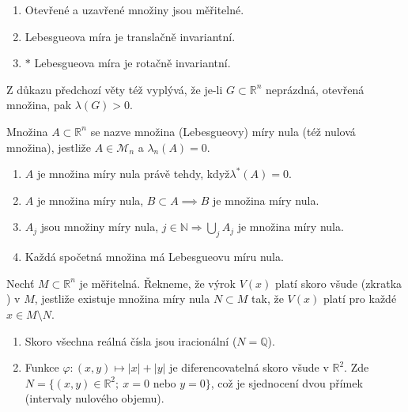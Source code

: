 \begin{veta}
\begin{enumerate}[1.]
\item Otevřené a uzavřené množiny jsou měřitelné.
\item Lebesgueova míra je translačně invariantní.
\item $\ast$ Lebesgueova míra je rotačně invariantní.
\end{enumerate}
\end{veta}

\begin{poznamka}
Z důkazu předchozí věty též vyplývá, že je-li $G \subset \mathbb{R}^n$
neprázdná, otevřená množina, pak $\lambda(G) > 0$.
\end{poznamka}

\begin{definice}
Množina $A \subset \mathbb{R}^n$ se nazve množina (Lebesgueovy) míry
nula (též nulová množina), jestliže $A \in \mathcal{M}_n$ a
$\lambda_n(A) = 0$.
\end{definice}

\begin{veta}
\begin{enumerate}[1.]
\item $A$ je množina míry nula právě tehdy, když$\lambda^*(A) = 0$.
\item $A$ je množina míry nula,
$B \subset A \implies B$ je množina míry nula.
\item $A_j$ jsou množiny míry nula,
$j \in \mathbb{N} \Rightarrow \bigcup_j A_j$ je množina míry nula.
\item Každá spočetná množina má Lebesgueovu míru nula.
\end{enumerate}
\end{veta}

\begin{definice}
Nechť $M \subset \mathbb{R}^n$ je měřitelná. Řekneme, že výrok $V(x)$
platí skoro všude (zkratka ) v $M$, jestliže existuje množina
míry nula $N \subset M$ tak, že $V(x)$ platí pro každé
$x \in M \setminus N$.
\end{definice}

\begin{priklad}
\begin{enumerate}[1.]
\item Skoro všechna reálná čísla jsou iracionální ($N = \mathbb{Q}$).
\item Funkce $\varphi \colon (x, y) \mapsto |x| + |y|$ je diferencovatelná
skoro všude v $\mathbb{R}^2$. Zde
$N = \{(x, y) \in \mathbb{R}^2; \ x = 0 \text{ nebo } y = 0\}$, což je
sjednocení dvou přímek (intervaly nulového objemu).
\end{enumerate}
\end{priklad}
